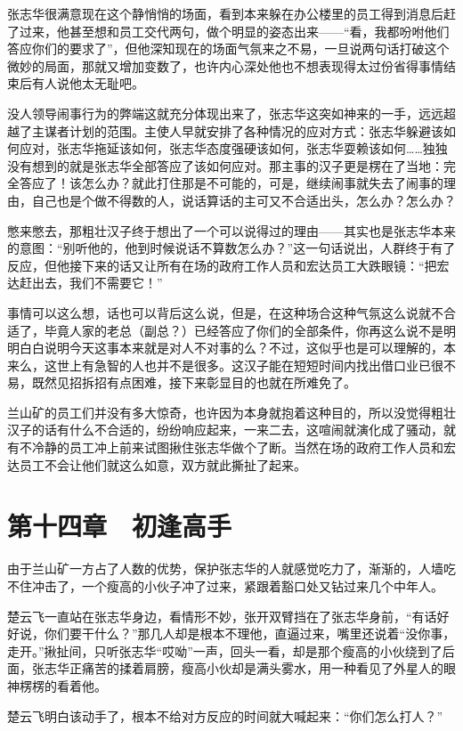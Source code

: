 张志华很满意现在这个静悄悄的场面，看到本来躲在办公楼里的员工得到消息后赶了过来，他甚至想和员工交代两句，做个明显的姿态出来——“看，我都吩咐他们答应你们的要求了”，但他深知现在的场面气氛来之不易，一旦说两句话打破这个微妙的局面，那就又增加变数了，也许内心深处他也不想表现得太过份省得事情结束后有人说他太无耻吧。

没人领导闹事行为的弊端这就充分体现出来了，张志华这突如神来的一手，远远超越了主谋者计划的范围。主使人早就安排了各种情况的应对方式：张志华躲避该如何应对，张志华拖延该如何，张志华态度强硬该如何，张志华耍赖该如何……独独没有想到的就是张志华全部答应了该如何应对。那主事的汉子更是楞在了当地：完全答应了！该怎么办？就此打住那是不可能的，可是，继续闹事就失去了闹事的理由，自己也是个做不得数的人，说话算话的主可又不合适出头，怎么办？怎么办？

憋来憋去，那粗壮汉子终于想出了一个可以说得过的理由——其实也是张志华本来的意图：“别听他的，他到时候说话不算数怎么办？”这一句话说出，人群终于有了反应，但他接下来的话又让所有在场的政府工作人员和宏达员工大跌眼镜：“把宏达赶出去，我们不需要它！”

事情可以这么想，话也可以背后这么说，但是，在这种场合这种气氛这么说就不合适了，毕竟人家的老总（副总？）已经答应了你们的全部条件，你再这么说不是明明白白说明今天这事本来就是对人不对事的么？不过，这似乎也是可以理解的，本来么，这世上有急智的人也并不是很多。这汉子能在短短时间内找出借口业已很不易，既然见招拆招有点困难，接下来彰显目的也就在所难免了。

兰山矿的员工们并没有多大惊奇，也许因为本身就抱着这种目的，所以没觉得粗壮汉子的话有什么不合适的，纷纷响应起来，一来二去，这喧闹就演化成了骚动，就有不冷静的员工冲上前来试图揪住张志华做个了断。当然在场的政府工作人员和宏达员工不会让他们就这么如意，双方就此撕扯了起来。

\section{第十四章　初逢高手}

由于兰山矿一方占了人数的优势，保护张志华的人就感觉吃力了，渐渐的，人墙吃不住冲击了，一个瘦高的小伙子冲了过来，紧跟着豁口处又钻过来几个中年人。

楚云飞一直站在张志华身边，看情形不妙，张开双臂挡在了张志华身前，“有话好好说，你们要干什么？”那几人却是根本不理他，直逼过来，嘴里还说着“没你事，走开。”揪扯间，只听张志华“哎呦”一声，回头一看，却是那个瘦高的小伙绕到了后面，张志华正痛苦的揉着肩膀，瘦高小伙却是满头雾水，用一种看见了外星人的眼神楞楞的看着他。

楚云飞明白该动手了，根本不给对方反应的时间就大喊起来：“你们怎么打人？”

